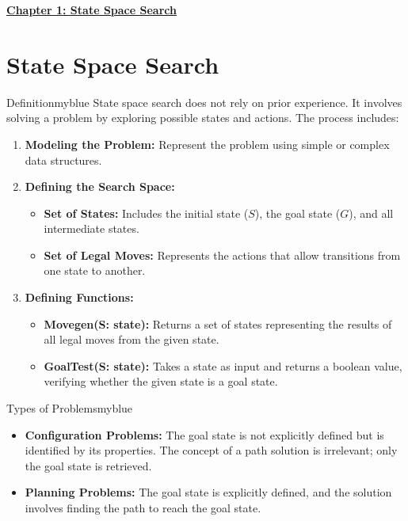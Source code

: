 \newpage
\null
\vspace{0.15cm}

\begin{center}
    \Huge{\textbf{\underline{Chapter 1: State Space Search}}}
\end{center}

\setcounter{section}{0}

\vspace{0.35cm}


\section{State Space Search}
\begin{prettyBox}{Definition}{myblue}
State space search does not rely on prior experience. It involves solving a problem by exploring possible states and actions. The process includes:
\begin{enumerate}
    \item \textbf{Modeling the Problem:} Represent the problem using simple or complex data structures.
    \item \textbf{Defining the Search Space:}
        \begin{itemize}
            \item \textbf{Set of States:} Includes the initial state (\(S\)), the goal state (\(G\)), and all intermediate states.
            \item \textbf{Set of Legal Moves:} Represents the actions that allow transitions from one state to another.
        \end{itemize}
    \item \textbf{Defining Functions:}
        \begin{itemize}
            \item \textbf{Movegen(S: state):} Returns a set of states representing the results of all legal moves from the given state.
            \item \textbf{GoalTest(S: state):} Takes a state as input and returns a boolean value, verifying whether the given state is a goal state.
        \end{itemize}
\end{enumerate}
\end{prettyBox}

\vspace{0.35cm}

\begin{prettyBox}{Types of Problems}{myblue}
\begin{itemize}
    \item \textbf{Configuration Problems:} 
    The goal state is not explicitly defined but is identified by its properties. The concept of a path solution is irrelevant; only the goal state is retrieved.
    \item \textbf{Planning Problems:} 
    The goal state is explicitly defined, and the solution involves finding the path to reach the goal state.
\end{itemize}
\end{prettyBox}

